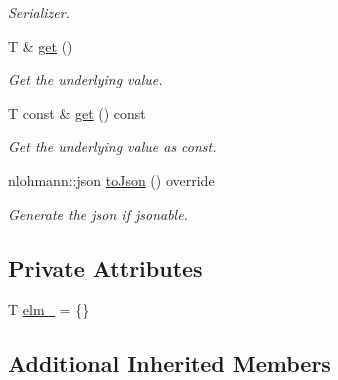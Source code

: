 \begin{DoxyCompactItemize}
\begin{DoxyCompactList}\small\item\em Serializer. \end{DoxyCompactList}\item 
T \& \hyperlink{structvt_1_1vrt_1_1collection_1_1storage_1_1_store_elm_3_01_t_00_01typename_01std_1_1enable__if_947e0655769addb625fb511f777768bd_aca0afee85781dbc7e76c3dff59ab4136}{get} ()
\begin{DoxyCompactList}\small\item\em Get the underlying value. \end{DoxyCompactList}\item 
T const  \& \hyperlink{structvt_1_1vrt_1_1collection_1_1storage_1_1_store_elm_3_01_t_00_01typename_01std_1_1enable__if_947e0655769addb625fb511f777768bd_afd8bb1f887dfb0a9d165693b1c7040ae}{get} () const
\begin{DoxyCompactList}\small\item\em Get the underlying value as const. \end{DoxyCompactList}\item 
nlohmann\+::json \hyperlink{structvt_1_1vrt_1_1collection_1_1storage_1_1_store_elm_3_01_t_00_01typename_01std_1_1enable__if_947e0655769addb625fb511f777768bd_aea4bf3c797fb58b2e53fcbf6010c31d1}{to\+Json} () override
\begin{DoxyCompactList}\small\item\em Generate the json if jsonable. \end{DoxyCompactList}\end{DoxyCompactItemize}
\subsection*{Private Attributes}
\begin{DoxyCompactItemize}
\item 
T \hyperlink{structvt_1_1vrt_1_1collection_1_1storage_1_1_store_elm_3_01_t_00_01typename_01std_1_1enable__if_947e0655769addb625fb511f777768bd_ad2f7d3b8c3c4358d7e2c352721aaa717}{elm\+\_\+} = \{\}
\end{DoxyCompactItemize}
\subsection*{Additional Inherited Members}


